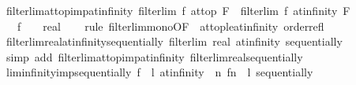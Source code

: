 \begin{isabellebody}
\isanewline
%
\endisadelimproof
\isanewline
{}\isamarkupfalse%
\ filterlim{\isacharunderscore}{\kern0pt}at{\isacharunderscore}{\kern0pt}top{\isacharunderscore}{\kern0pt}imp{\isacharunderscore}{\kern0pt}at{\isacharunderscore}{\kern0pt}infinity{\isacharcolon}{\kern0pt}\ {\isachardoublequoteopen}filterlim\ f\ at{\isacharunderscore}{\kern0pt}top\ F\ {\isasymLongrightarrow}\ filterlim\ f\ at{\isacharunderscore}{\kern0pt}infinity\ F{\isachardoublequoteclose}\isanewline
\ \ \ f\ {\isacharcolon}{\kern0pt}{\isacharcolon}{\kern0pt}\ {\isachardoublequoteopen}{\isacharunderscore}{\kern0pt}\ {\isasymRightarrow}\ real{\isachardoublequoteclose}\isanewline
%
\isadelimproof
\ \ %
\endisadelimproof
%
\isatagproof
{}\isamarkupfalse%
\ {\isacharparenleft}{\kern0pt}rule\ filterlim{\isacharunderscore}{\kern0pt}mono{\isacharbrackleft}{\kern0pt}OF\ {\isacharunderscore}{\kern0pt}\ at{\isacharunderscore}{\kern0pt}top{\isacharunderscore}{\kern0pt}le{\isacharunderscore}{\kern0pt}at{\isacharunderscore}{\kern0pt}infinity\ order{\isacharunderscore}{\kern0pt}refl{\isacharbrackright}{\kern0pt}{\isacharparenright}{\kern0pt}%
\endisatagproof
{\isafoldproof}%
%
\isadelimproof
\isanewline
%
\endisadelimproof
\isanewline
{}\isamarkupfalse%
\ filterlim{\isacharunderscore}{\kern0pt}real{\isacharunderscore}{\kern0pt}at{\isacharunderscore}{\kern0pt}infinity{\isacharunderscore}{\kern0pt}sequentially{\isacharcolon}{\kern0pt}\ {\isachardoublequoteopen}filterlim\ real\ at{\isacharunderscore}{\kern0pt}infinity\ sequentially{\isachardoublequoteclose}\isanewline
%
\isadelimproof
\ \ %
\endisadelimproof
%
\isatagproof
{}\isamarkupfalse%
\ {\isacharparenleft}{\kern0pt}simp\ add{\isacharcolon}{\kern0pt}\ filterlim{\isacharunderscore}{\kern0pt}at{\isacharunderscore}{\kern0pt}top{\isacharunderscore}{\kern0pt}imp{\isacharunderscore}{\kern0pt}at{\isacharunderscore}{\kern0pt}infinity\ filterlim{\isacharunderscore}{\kern0pt}real{\isacharunderscore}{\kern0pt}sequentially{\isacharparenright}{\kern0pt}%
\endisatagproof
{\isafoldproof}%
%
\isadelimproof
\isanewline
%
\endisadelimproof
\isanewline
{}\isamarkupfalse%
\ lim{\isacharunderscore}{\kern0pt}infinity{\isacharunderscore}{\kern0pt}imp{\isacharunderscore}{\kern0pt}sequentially{\isacharcolon}{\kern0pt}\ {\isachardoublequoteopen}{\isacharparenleft}{\kern0pt}f\ {\isasymlonglongrightarrow}\ l{\isacharparenright}{\kern0pt}\ at{\isacharunderscore}{\kern0pt}infinity\ {\isasymLongrightarrow}\ {\isacharparenleft}{\kern0pt}{\isacharparenleft}{\kern0pt}{\isasymlambda}n{\isachardot}{\kern0pt}\ f{\isacharparenleft}{\kern0pt}n{\isacharparenright}{\kern0pt}{\isacharparenright}{\kern0pt}\ {\isasymlonglongrightarrow}\ l{\isacharparenright}{\kern0pt}\ sequentially{\isachardoublequoteclose}\isanewline

\end{isabellebody}
